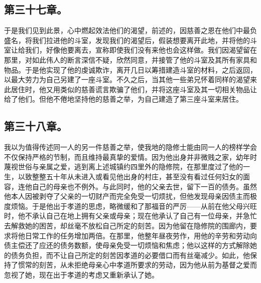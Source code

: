 
\subsection{第三十七章。}

\par

于是我们见到此景，心中燃起效法他们的渴望，前述的，因慈善之恩在他们中最负盛名，将我们拉进他的斗室，发现我们的渴望后，假装想要离开此地，并将他的斗室让给我们，好像他要离去，宣称即使我们没有来他也会这样做。我们因渴望留在那里，对如此伟人的断言深信不疑，欣然同意，并接管了他的斗室及其所有家具和物品。于是他实现了他的虔诚欺诈，离开几日以筹措建造斗室的材料，之后返回，以最大劳力为自己另建了一座斗室。不久之后，当其他一些弟兄怀着同样的渴望来此居住时，他又用类似的慈善谎言欺骗了他们，并将这座斗室及其一切相关物品让给了他们。但他不倦地坚持他的慈善之举，为自己建造了第三座斗室来居住。\par


\subsection{第三十八章。}

\par

我以为值得传述同一人的另一件慈善之举，使我地的隐修士能由同一人的榜样学会不仅保持严格的节制，而且维持最真挚的爱情。因为他出身并非微贱之家，幼年时蔑视世俗与亲属之爱，逃到离上述城镇约四里外的隐修院，在那里度过了他的一生，以致整整五十年从未进入或看见他出身的村庄，甚至没有看过任何妇女的面容，连他自己的母亲也不例外。与此同时，他的父亲去世，留下一百的债务。虽然他本人因被剥夺了父亲的一切财产而完全免受一切烦扰，但他发现母亲因债主而极度烦恼。于是他出于孝道的思虑，略微缓和了那福音的严厉——从前在他父母兴旺时，他不承认自己在地上拥有父亲或母亲；现在他承认了自己有一位母亲，并急忙去解救她的困苦，却丝毫不放松自己所定的刻苦。因为他留在隐修院的围廊内，要求将他日常工作的任务增加两倍。在那里，他整年昼夜劳作，用他的辛劳和劳动向债主偿还了应还的债务数额，使母亲免受一切烦恼和焦虑；他以这样的方式解除她的债务负担，而不让自己所定的刻苦因孝道的必要借口而有丝毫减少。如此，他保持了惯常的刻苦，从未拒绝母亲心中孝道所要求的劳动，因为他从前为基督之爱而忽视了她，现在出于孝道的考虑又重新承认了她。\par

